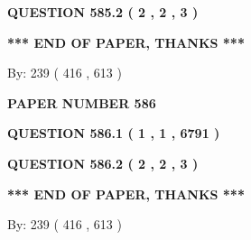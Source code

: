 \documentclass[12pt]{article}
\begin{document}
  
  
\vspace{0.2in}
  
{\textbf{\Large{QUESTION
585.2 
 ( 2 , 2 , 3 )
}}}
  
  
   
   
 \vspace{0.2in}
 
   
   
   
   
\vspace{1.0in} 
{\textbf{\large{ *** END OF PAPER, THANKS *** }}} 
   
   
\hspace{1.0in} By: 
 239 ( 416 ,  613 )
   
   
   
   
\newpage 
\setcounter{page}{ 
   586001 } 
   
   
   
   
 {\textbf{ \Large{ PAPER NUMBER  586  }}}
   
   
\vspace{0.2in}
   
   
   
   
   
   
 \vspace{0.2in}
 
 
 
 
   
   
  
\vspace{0.2in}
  
{\textbf{\Large{QUESTION
586.1 
 ( 1 , 1 , 6791 )
}}}
  
  
  
\vspace{0.2in}
  
{\textbf{\Large{QUESTION
586.2 
 ( 2 , 2 , 3 )
}}}
  
  
   
   
 \vspace{0.2in}
 
   
   
   
   
\vspace{1.0in} 
{\textbf{\large{ *** END OF PAPER, THANKS *** }}} 
   
   
\hspace{1.0in} By: 
 239 ( 416 ,  613 )
   
   
   
\end{document}
